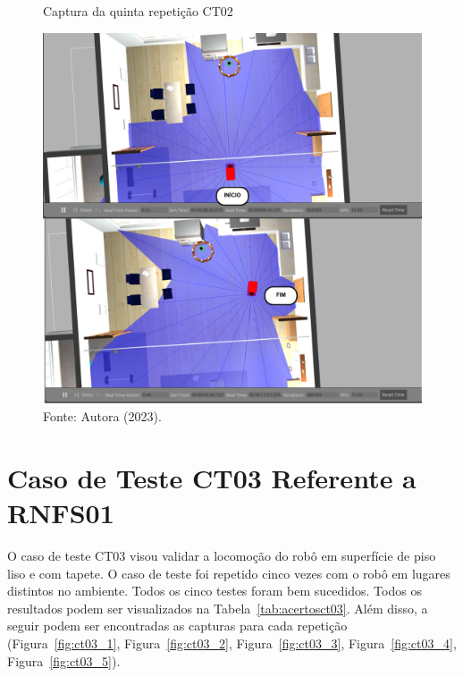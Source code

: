\begin{figure}[H]
    \centering
    \caption{Captura da quinta repetição CT02}
    \includegraphics[scale=0.5]{ct02_5.png}
    \caption*{Fonte: Autora (2023).}
    \label{fig:ct02_5}
\end{figure}

\section{Caso de Teste CT03 Referente a RNFS01}
O caso de teste CT03 visou validar a locomoção do robô em superfície de piso liso e com tapete. O caso de teste foi repetido cinco vezes com o robô em lugares distintos no ambiente. Todos os cinco testes foram bem sucedidos. Todos os resultados podem ser visualizados na Tabela~\ref{tab:acertosct03}. Além disso, a seguir podem ser encontradas as capturas para cada repetição (Figura~\ref{fig:ct03_1}, Figura~\ref{fig:ct03_2}, Figura~\ref{fig:ct03_3}, Figura~\ref{fig:ct03_4}, Figura~\ref{fig:ct03_5}).


